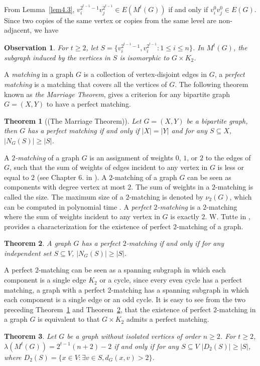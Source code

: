 \documentclass{article}
\newtheorem{theorem} {Theorem}
\newtheorem{obs}{Observation}
\newtheorem{open problem} {Open Problem}
\numberwithin{lemma}{section}
\numberwithin{theorem}{section}
\numberwithin{cor}{section}
\numberwithin{prop}{section}
\numberwithin{con}{section}
\numberwithin{claim}{section}
\numberwithin{obs}{section}
\numberwithin{dnt}{section}
\begin{document}
From Lemma~\ref{lem4.3}, $v_i^{2^{t-1}-1}v_j^{2^{t-1}}\in E(M^t(G))$ if and only if $v_i^0v_j^0\in E(G)$. Since two copies of the same vertex or copies from the same level are non-adjacent, we have 
\begin{obs} \label{obs1}
	For $t\geq 2$, let $S=\{v_i^{2^{t-1}-1},v_i^{2^{t-1}} :1\leq i\leq n \}$. In $M^t(G)$, the subgraph induced by the vertices in $S$ is isomorphic to $G\times K_2$.
\end{obs}
A \textit{matching} in a graph $G$ is a collection of vertex-disjoint edges in $G$, a \textit{perfect matching} is a matching that covers all the vertices of $G$. The following theorem known as \textit{the Marriage Theorem}, gives a criterion for any bipartite graph $G=(X,Y)$ to have a perfect matching.
\begin{theorem}[(The Marriage Theorem)]\label{th4.5}
	Let $G=(X,Y)$ be a bipartite graph, then $G$ has a perfect matching  if and only if $|X|=|Y|$ and for any $S\subseteq X$, $|N_G(S)|\geq |S|$.
\end{theorem}
A \textit{$2$-matching}  of a graph $G$  is an assignment of weights $0$, $1$, or $2$ to the edges of $G$, such that the sum of weights of edges incident to any vertex in $G$ is less or equal to $2$ (see Chapter 6. in \cite{lovas}).  A $2$-matching of a graph $G$ can be seen as components with degree vertex at most $2$. The sum of weights in a $2$-matching is called the size. The maximum size of a $2$-matching is denoted by $\nu_2(G)$, which can be computed in polynomial time \cite{tutte}. A \textit{perfect $2$-matching} is a $2$-matching where the sum of weights incident to any vertex in $G$ is exactly $2$. W. Tutte in \cite{tutte}, provides a characterization for the existence of perfect $2$-matching of a graph.
\begin{theorem}\label{th4.6}\cite{tutte}
	A graph $G$ has a perfect $2$-matching  if and only if for any independent set $S\subseteq V$, $|N_G(S)|\geq |S|$. 
\end{theorem}
A perfect $2$-matching can be seen as a spanning subgraph in which each component is a single edge $K_2$ or a cycle, since every even cycle has a perfect matching, a graph with a perfect $2$-matching has a spanning subgraph in which each component is a single edge or an odd cycle. It is easy to see from the two preceding Theorem~\ref{th4.5} and Theorem~\ref{th4.6}, that the existence of perfect $2$-matching in a graph $G$ is equivalent to that $G\times K_2$ admits a perfect matching.
\begin{theorem}\label{th4.7}
	Let $G$ be a graph without isolated vertices of order $n\geq 2$. For $t\geq 2$, $\lambda(M^t(G))=2^{t-1}(n+2)-2$ if and only if for any $S\subseteq V$  $|D_2(S)|\geq |S|$, where $D_2(S)=\{x\in V :\exists v\in S, d_G(x,v)>2 \}$.	
\end{theorem}
\end{document}
